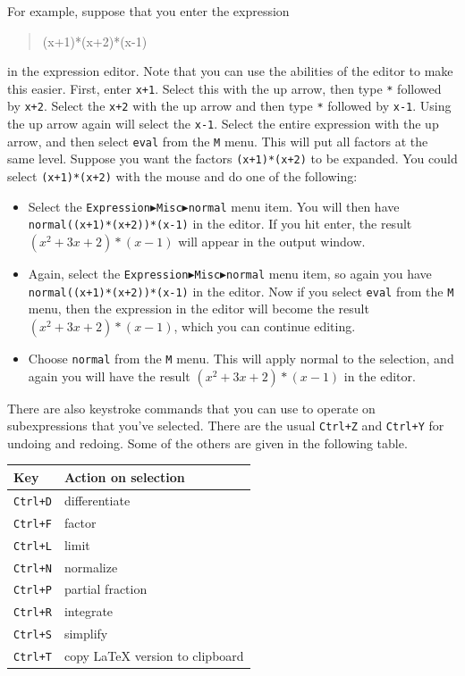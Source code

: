 \documentclass[a4paper,11pt]{book}
\newenvironment{giaccmd}
{\begin{quote}\ttfamily}
{\end{quote}}
\begin{document}
For example, suppose that you enter the expression
\begin{giaccmd}
  (x+1)*(x+2)*(x-1)
\end{giaccmd}
in the expression editor.  Note that you can use the abilities of the
editor to make this easier.  First, enter \texttt{x+1}.  Select this
with the up arrow, then type \texttt{*} followed by \texttt{x+2}.  Select
the \texttt{x+2} with the up arrow and then type \texttt{*} followed
by \texttt{x-1}.  Using the up arrow again will select the \texttt{x-1}.
Select the entire expression with the up arrow, and then select
\texttt{eval} from the \texttt{M} menu.  This will put all factors at
the same level.  Suppose you want the factors \texttt{(x+1)*(x+2)} to
be expanded.  You could select \texttt{(x+1)*(x+2)} with the mouse and
do one of the following:
\begin{itemize}
  \item
  Select the
  \texttt{Expression$\blacktriangleright$Misc$\blacktriangleright$normal}
  menu item.  You will then have \texttt{normal((x+1)*(x+2))*(x-1)} in
  the editor.  If you hit enter, the result $(x^2 + 3x + 2)*(x-1)$ will
  appear in the output window.
  \item
  Again, select the   
  \texttt{Expression$\blacktriangleright$Misc$\blacktriangleright$normal}
  menu item, so again you have \texttt{normal((x+1)*(x+2))*(x-1)} in
  the editor.  Now if you select \texttt{eval} from the \texttt{M}
  menu, then the expression in the editor will become the result
  $(x^2 + 3x + 2)*(x-1)$, which you can continue editing.
  \item
  Choose \texttt{normal} from the \texttt{M} menu.  This will apply
  normal to the selection, and again you will have the result
  $(x^2 + 3x + 2)*(x-1)$ in the editor.
\end{itemize}

There are also keystroke commands that you can use to operate
on subexpressions that you've selected.  There are the usual
\texttt{Ctrl+Z} and \texttt{Ctrl+Y} for undoing and redoing.  Some of
the others are given in the following table.

\begin{center}
\begin{tabular}{|p{}|p{}|}
\hline
\textbf{Key} & \textbf{Action on selection}\\
\hline\hline
\texttt{Ctrl+D}   & differentiate\\
\texttt{Ctrl+F} & factor\\
\texttt{Ctrl+L} & limit\\
\texttt{Ctrl+N} & normalize\\
\texttt{Ctrl+P} & partial fraction\\
\texttt{Ctrl+R} & integrate\\
\texttt{Ctrl+S} & simplify\\
\texttt{Ctrl+T} & copy \LaTeX{} version to clipboard\\
\hline
\end{tabular}
\end{center}
\end{document}
